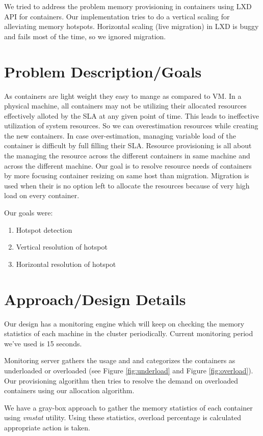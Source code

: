 \documentclass[a4paper, 11pt]{article}
\begin{document}
We tried to address the problem memory provisioning in containers using LXD \cite{lxd} API for containers. Our implementation tries to do a vertical scaling for alleviating memory hotspots. Horizontal scaling (live migration) in LXD is buggy and fails most of the time, so we ignored migration.

\section{Problem Description/Goals}
As containers are light weight they easy to mange as compared to VM. In a physical machine, all containers may not be utilizing their allocated resources effectively alloted by the SLA at any given point of time. This leads to ineffective utilization of system resources. So we can overestimation resources while creating the new containers. In case over-estimation, managing variable load of the container is difficult by full filling their SLA. Resource provisioning is all about the managing the resource across the different containers in same machine and across the different machine. Our goal is to resolve resource needs of containers by more focusing container resizing on same host than migration. Migration is used when their is no option left to allocate the resources because of very high load on every container.

Our goals were:
\begin{enumerate}
 \item Hotspot detection
 \item Vertical resolution of hotspot
 \item Horizontal resolution of hotspot
\end{enumerate}


\section{Approach/Design Details}
Our design has a monitoring engine which will keep on checking the memory statistics of each machine in the cluster periodically. Current monitoring period we've used is 15 seconds.

Monitoring server gathers the usage and and categorizes the containers as underloaded or overloaded (see Figure \ref{fig:underload} and Figure \ref{fig:overload}). Our provisioning algorithm then tries to resolve the demand on overloaded containers using our allocation algorithm.

We have a gray-box approach to gather the memory statistics of each container using \textit{vmstat}\cite{vmstat} utility. Using these statistics, overload percentage is calculated appropriate action is taken.
\end{document}

